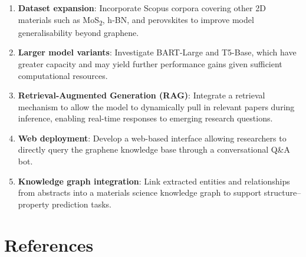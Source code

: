 \documentclass[12pt, a4paper]{report}
\begin{document}
\begin{enumerate}[leftmargin=*]
    \item \textbf{Dataset expansion}: Incorporate Scopus corpora covering other 2D materials such as MoS\textsubscript{2}, h-BN, and perovskites to improve model generalisability beyond graphene.

    \item \textbf{Larger model variants}: Investigate BART-Large and T5-Base, which have greater capacity and may yield further performance gains given sufficient computational resources.

    \item \textbf{Retrieval-Augmented Generation (RAG)}: Integrate a retrieval mechanism to allow the model to dynamically pull in relevant papers during inference, enabling real-time responses to emerging research questions.

    \item \textbf{Web deployment}: Develop a web-based interface allowing researchers to directly query the graphene knowledge base through a conversational Q\&A bot.

    \item \textbf{Knowledge graph integration}: Link extracted entities and relationships from abstracts into a materials science knowledge graph to support structure--property prediction tasks.
\end{enumerate}

\chapter*{References}
\end{document}
